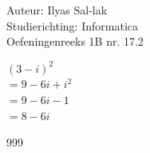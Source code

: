 \documentclass[a4paper]{article}
\begin{document}
\noindent \large Auteur: Ilyas Sal-lak \\
\noindent \large Studierichting: Informatica\\
\noindent \large Oefeningenreeks 1B nr. 17.2\\

\medskip

\normalsize

$\left(3 - i\right)^2$ \\

$= 9 - 6i + i^2$ \\

$= 9 - 6i - 1$ \\

$= 8 - 6i$

\begin{thebibliography}{999}
\end{thebibliography}
\end{document}
